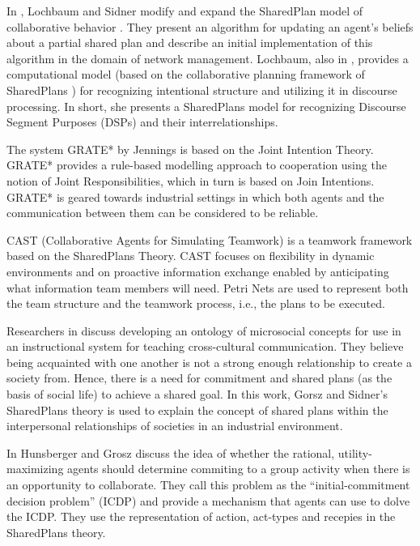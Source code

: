 \documentclass[11pt]{article}
\begin{document}
In \cite{lochbaum:plan-models}, Lochbaum and Sidner modify and expand the
SharedPlan model of collaborative behavior \cite{grosz:plans-discourse}. They
present an algorithm for updating an agent’s beliefs about a partial shared plan
and describe an initial implementation of this algorithm in the domain of
network management. Lochbaum, also in \cite{lochbaum:collaborative-planning},
provides a computational model (based on the collaborative planning framework
of SharedPlans \cite{grosz:collaboration}) for recognizing intentional structure
and utilizing it in discourse processing. In short, she presents a SharedPlans
model for recognizing Discourse Segment Purposes (DSPs)
\cite{grosz:plans-discourse} \cite{sidner:discourse-collaborative-negotiation}
and their interrelationships.

The system GRATE* by Jennings \cite{jennings:joint-intention-hybrid} is based on
the Joint Intention Theory. GRATE* provides a rule-based modelling approach to
cooperation using the notion of Joint Responsibilities, which in turn is based
on Join Intentions. GRATE* is geared towards industrial settings in which both
agents and the communication between them can be considered to be reliable.

CAST (Collaborative Agents for Simulating Teamwork) \cite{yen:cast}
\cite{yin:knowledge-based-sharedplans} is a teamwork framework based on the
SharedPlans Theory. CAST focuses on flexibility in dynamic environments and on
proactive information exchange enabled by anticipating what information team
members will need. Petri Nets are used to represent both the team structure and
the teamwork process, i.e., the plans to be executed.

Researchers in \cite{hobbs:microsociology-relationship} discuss developing an
ontology of microsocial concepts for use in an instructional system for teaching
cross-cultural communication. They believe being acquainted with one another is
not a strong enough relationship to create a society from. Hence, there is a
need for commitment and shared plans (as the basis of social life) to achieve a
shared goal. In this work, Gorsz and Sidner's SharedPlans theory
\cite{grosz:plans-discourse} is used to explain the concept of shared plans
within the interpersonal relationships of societies in an industrial
environment.

In \cite{hunsberger:auction-collaborative} Hunsberger and Grosz discuss the idea
of whether the rational, utility-maximizing agents should determine commiting to
a group activity when there is an opportunity to collaborate. They call this
problem as the ``initial-commitment decision problem'' (ICDP) and provide a
mechanism that agents can use to dolve the ICDP. They use the representation of
action, act-types and recepies in the SharedPlans theory.
\end{document}
